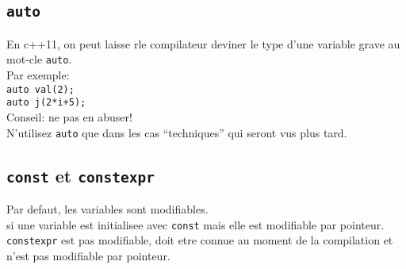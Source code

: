 \documentclass[../main.tex]{subfiles}
\begin{document}
\subsection{\texttt{auto}}

En c++11, on peut laisse rle compilateur deviner le type d'une variable grave au mot-cle \texttt{auto}.\\
Par exemple:\\
\texttt{auto val(2);}\\
\texttt{auto j(2*i+5);}\\
Conseil: ne pas en abuser!\\
N'utilisez \texttt{auto} que dans les cas ``techniques'' qui seront vus plus tard.

\subsection{ \texttt{const} et \texttt{constexpr} }
Par defaut, les variables sont modifiables.\\
si une variable est initialisee avec \texttt{const} mais elle est modifiable par pointeur.\\
\texttt{constexpr} est pas modifiable, doit etre connue au moment de la compilation et n'est pas modifiable par pointeur.
\end{document}

